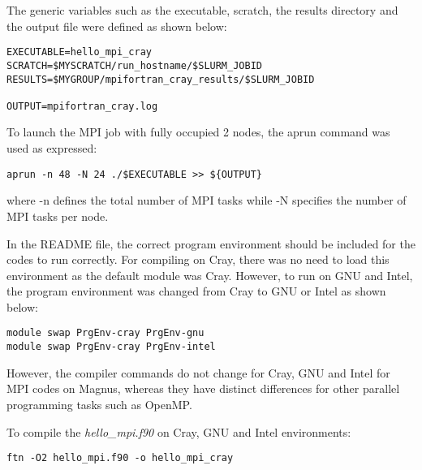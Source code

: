 The generic variables such as the executable, scratch, the results directory and the output file were defined as shown below:

\begin{tcolorbox}
\begin{Verbatim}[fontsize=\scriptsize]
EXECUTABLE=hello_mpi_cray
SCRATCH=$MYSCRATCH/run_hostname/$SLURM_JOBID
RESULTS=$MYGROUP/mpifortran_cray_results/$SLURM_JOBID

OUTPUT=mpifortran_cray.log 
\end{Verbatim}
\end{tcolorbox}

To launch the MPI job with fully occupied 2 nodes, the aprun command was used as expressed:

\begin{tcolorbox}
\begin{Verbatim}[fontsize=\scriptsize]
aprun -n 48 -N 24 ./$EXECUTABLE >> ${OUTPUT}
\end{Verbatim}
\end{tcolorbox}

where -n defines the total number of MPI tasks while -N specifies the number of MPI tasks per node.

In the README file, the correct program environment should be included for the codes to run correctly. For compiling on Cray, there was no need to load
this environment as the default module was Cray. However, to run on GNU and Intel, the program environment was changed from Cray to GNU or Intel as
shown below:

\begin{tcolorbox}
\begin{Verbatim}[fontsize=\scriptsize]
module swap PrgEnv-cray PrgEnv-gnu
module swap PrgEnv-cray PrgEnv-intel
\end{Verbatim}
\end{tcolorbox}

However, the compiler commands do not change for Cray, GNU and Intel for MPI codes on Magnus, whereas they have distinct differences for other parallel
programming tasks such as OpenMP.

To compile the \emph{hello\_mpi.f90} on Cray, GNU and Intel environments:

\begin{tcolorbox}
\begin{Verbatim}[fontsize=\scriptsize]
ftn -O2 hello_mpi.f90 -o hello_mpi_cray
\end{Verbatim}
\end{tcolorbox}

